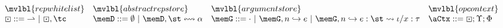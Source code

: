 \begin{figure*}[p!]
\small
$\begin{array}{llll}
\mvlbl{rep whitelist} & \mvlbl{abstract rep store} & \mvlbl{argument store} & \mvlbl{op context}\\
\boxdot ::= {\rightharpoonup} ~|~ \boxdot, \tc \ & \memD ::= \emptyset ~|~ \memD, \st \leftrightsquigarrow \alpha & \memG ::= \cdot ~|~ \memG, n \hookrightarrow e ~|~ \memG, n \hookrightarrow e : \st \leadsto \iota/x : \tau & \aCtx ::= \boxdot; \Upsilon; \Phi 
\end{array}$\\

~\hfill{\fbox{$\snorm{\st}{\memD}{\memG}{\aCtx}{\st\moutput}{\memD\moutput}{\memG\moutput}$}}~
\fbox{$\serrX{\st}$}
\begin{mathpar}






\end{mathpar}
\end{figure*}
